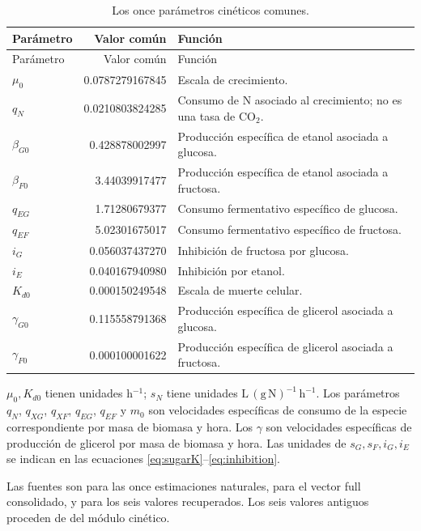 \documentclass[11pt,a4paper]{article}
\newcommand{\code}[1]{\texttt{\detokenize{#1}}}
\begin{document}
\begin{longtable}{@{}P{1.9cm}rP{8.5cm}@{}}
\caption{Los once parámetros cinéticos comunes.}\label{tab:commontheta}\\
\toprule Parámetro & Valor común & Función \\\midrule\endfirsthead
\toprule Parámetro & Valor común & Función \\\midrule\endhead
\bottomrule\endfoot
$\mu_0$ & 0.0787279167845 & Escala de crecimiento.\\
$q_N$ & 0.0210803824285 & Consumo de N asociado al crecimiento; no es una tasa de CO\(_2\).\\
$\beta_{G0}$ & 0.428878002997 & Producción específica de etanol asociada a glucosa.\\
$\beta_{F0}$ & 3.44039917477 & Producción específica de etanol asociada a fructosa.\\
$q_{EG}$ & 1.71280679377 & Consumo fermentativo específico de glucosa.\\
$q_{EF}$ & 5.02301675017 & Consumo fermentativo específico de fructosa.\\
$i_G$ & 0.056037437270 & Inhibición de fructosa por glucosa.\\
$i_E$ & 0.040167940980 & Inhibición por etanol.\\
$K_{d0}$ & 0.000150249548 & Escala de muerte celular.\\
$\gamma_{G0}$ & 0.115558791368 & Producción específica de glicerol asociada a glucosa.\\
$\gamma_{F0}$ & 0.000100001622 & Producción específica de glicerol asociada a fructosa.\\
\end{longtable}

$\mu_0,K_{d0}$ tienen unidades h$^{-1}$; $s_N$ tiene unidades
$\mathrm{L\,(g\,N)^{-1}\,h^{-1}}$. Los parámetros $q_N$, $q_{XG}$, $q_{XF}$,
$q_{EG}$, $q_{EF}$ y $m_0$ son velocidades específicas de consumo de la especie
correspondiente por masa de biomasa y hora. Los $\gamma$ son velocidades
específicas de producción de glicerol por masa de biomasa y hora.
Las unidades de $s_G,s_F,i_G,i_E$ se indican en las ecuaciones
\eqref{eq:sugarK}--\eqref{eq:inhibition}.

Las fuentes son
para las once estimaciones naturales,
para el vector full consolidado, y
para los seis valores recuperados. Los seis valores antiguos proceden de
\code{DEFAULT_THETA} del módulo cinético.
\end{document}
